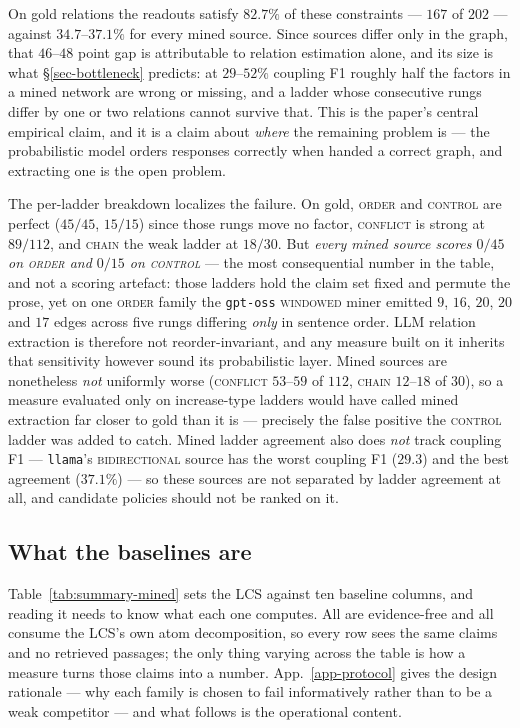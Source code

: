 On gold relations the readouts satisfy $82.7\%$ of these constraints --- $167$ of $202$ --- against
$34.7$--$37.1\%$ for every mined source. Since sources differ only in the graph, that $46$--$48$ point gap is
attributable to relation estimation alone, and its size is what §\ref{sec-bottleneck} predicts: at
$29$--$52\%$ coupling F1 roughly half the factors in a mined network are wrong or missing, and a ladder
whose consecutive rungs differ by one or two relations cannot survive that. This is the paper's central
empirical claim, and it is a claim about \emph{where} the remaining problem is --- the probabilistic
model orders responses correctly when handed a correct graph, and extracting one is the open problem.

The per-ladder breakdown localizes the failure. On gold, \textsc{order} and \textsc{control} are perfect
($45/45$, $15/15$) since those rungs move no factor, \textsc{conflict} is strong at $89/112$, and \textsc{chain}
the weak ladder at $18/30$. But \emph{every mined source scores $0/45$ on \textsc{order} and $0/15$ on
\textsc{control}} --- the most consequential number in the table, and not a scoring artefact: those ladders hold
the claim set fixed and permute the prose, yet on one \textsc{order} family the \texttt{gpt-oss}
\textsc{windowed} miner emitted $9$, $16$, $20$, $20$ and $17$ edges across five rungs differing \emph{only} in
sentence order. LLM relation extraction is therefore not reorder-invariant, and any measure built on it inherits
that sensitivity however sound its probabilistic layer. Mined sources are nonetheless \emph{not} uniformly worse
(\textsc{conflict} $53$--$59$ of $112$, \textsc{chain} $12$--$18$ of $30$), so a measure evaluated only on
increase-type ladders would have called mined extraction far closer to gold than it is --- precisely the false
positive the \textsc{control} ladder was added to catch. Mined ladder agreement also does \emph{not} track coupling
F1 --- \texttt{llama}'s \textsc{bidirectional} source has the worst coupling F1 ($29.3$) and the best agreement
($37.1\%$) --- so these sources are not separated by ladder agreement at all, and candidate policies should not be
ranked on it.

\subsection{What the baselines are}
\label{sec-baselines-what}

Table~\ref{tab:summary-mined} sets the LCS against ten baseline columns, and reading it needs to know what
each one computes. All are evidence-free and all consume the LCS's own atom decomposition, so every
row sees the same claims and no retrieved passages; the only thing varying across the table is how a
measure turns those claims into a number. App.~\ref{app-protocol} gives the design rationale --- why
each family is chosen to fail informatively rather than to be a weak competitor --- and what follows
is the operational content.

